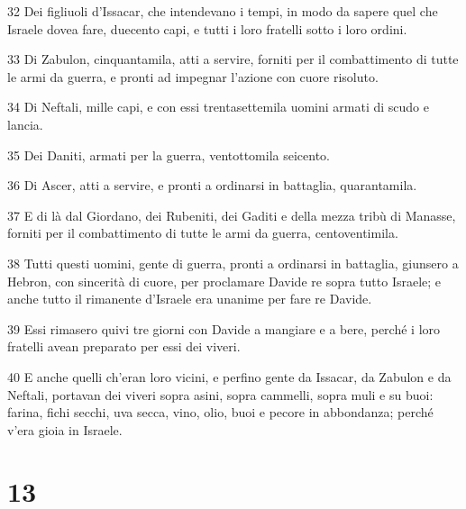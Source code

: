 \par 32 Dei figliuoli d'Issacar, che intendevano i tempi, in modo da sapere quel che Israele dovea fare, duecento capi, e tutti i loro fratelli sotto i loro ordini.
\par 33 Di Zabulon, cinquantamila, atti a servire, forniti per il combattimento di tutte le armi da guerra, e pronti ad impegnar l'azione con cuore risoluto.
\par 34 Di Neftali, mille capi, e con essi trentasettemila uomini armati di scudo e lancia.
\par 35 Dei Daniti, armati per la guerra, ventottomila seicento.
\par 36 Di Ascer, atti a servire, e pronti a ordinarsi in battaglia, quarantamila.
\par 37 E di là dal Giordano, dei Rubeniti, dei Gaditi e della mezza tribù di Manasse, forniti per il combattimento di tutte le armi da guerra, centoventimila.
\par 38 Tutti questi uomini, gente di guerra, pronti a ordinarsi in battaglia, giunsero a Hebron, con sincerità di cuore, per proclamare Davide re sopra tutto Israele; e anche tutto il rimanente d'Israele era unanime per fare re Davide.
\par 39 Essi rimasero quivi tre giorni con Davide a mangiare e a bere, perché i loro fratelli avean preparato per essi dei viveri.
\par 40 E anche quelli ch'eran loro vicini, e perfino gente da Issacar, da Zabulon e da Neftali, portavan dei viveri sopra asini, sopra cammelli, sopra muli e su buoi: farina, fichi secchi, uva secca, vino, olio, buoi e pecore in abbondanza; perché v'era gioia in Israele.

\chapter{13}

